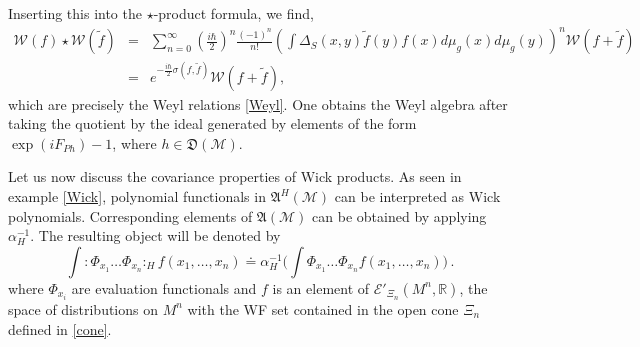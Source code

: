 \documentclass[12pt]{article}
\newcommand{\fA}{\mathfrak{A}}
\newcommand{\D}{\mathfrak{D}}
\newcommand{\Ecal}{\mathcal{E}}
\newcommand{\Mcal}{\mathcal{M}}
\newcommand{\Wcal}{\mathcal{W}}
\newcommand{\RR}{\mathbb{R}}           %
\newcommand{\al}{\alpha}
\newcommand{\sst}[1]{\scriptscriptstyle{#1}}  %
\newcommand{\1}{\mathds{1}}                         %
\newcommand{\be}{\begin{equation}}
\newcommand{\ee}{\end{equation}}
\begin{document}
{{Inserting this into the $\star$-product formula, we find,
\begin{eqnarray*}
\Wcal(f) \star \Wcal(\tilde{f}) &=&  \sum_{n=0}^{\infty} \left( \frac{i \hbar}{2}\right)^n \frac{(-1)^n}{n!} \left( \int \Delta_S(x,y) \tilde{f}(y)f(x)d\mu_g(x)d\mu_g(y)\right)^n\Wcal(f+\tilde{f})\\
&=& e^{-\frac{i \hbar}{2}\sigma(f,\tilde{f})} \Wcal(f+\tilde{f}),
\end{eqnarray*}
which are precisely the Weyl relations \eqref{Weyl}. One obtains the Weyl algebra after taking the quotient by the ideal generated by elements of the form $\exp(iF_{Ph})-1$, where $h\in\D(\Mcal)$.

 Let us now discuss the covariance properties of Wick products. As seen in example \ref{Wick}, polynomial functionals in $\fA^{\sst H}(\Mcal)$ can be interpreted as Wick polynomials.
Corresponding elements of $\fA(\Mcal)$ can be obtained by applying $\al_H^{-1}$. The resulting object will be denoted by
\be\label{polynomials1}
\int :\Phi_{x_1}\dots\Phi_{x_n}:_H f(x_1,\dots, x_n)\doteq \al^{-1}_H\Big(\int \Phi_{x_1}\dots\Phi_{x_n} f(x_1,\dots, x_n)\Big)\,.
\ee
where $\Phi_{x_i}$ are evaluation functionals and $f$ is an element of $\Ecal'_{\Xi_n}(M^n,\RR)$, the space of distributions on $M^n$ with the WF set contained in the open cone $\Xi_n$ defined in \eqref{cone}.
 
}}
\end{document}
